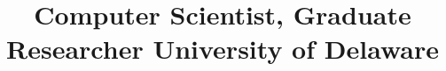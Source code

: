 \title{\normalsize
	Computer Scientist,
	Graduate Researcher\newline
	University of Delaware
}                       %





\newcommand{\see}[1]{\hfill{\itshape\color{see}\footnotesize{}see #1}}

\newcommand{\br}{\ifinner, \else\\\fi}

\newcommand{\github}[1]{\href{https://github.com/SteVwonder/#1}{#1}}

\makeatletter
\def\@bibitem#1{%
	\def\mykey{#1}%
	\item\if@filesw\immediate\write\@auxout {\string\bibcite{#1}%
	{\the\value{\@listctr}}}\fi\ignorespaces}



\makeatother

\newlength{\bibliographysectionspacing}            %
\setlength{\bibliographysectionspacing}{.15in}
\newcommand{\bibsectiontitleformat}[1]{#1}         %

